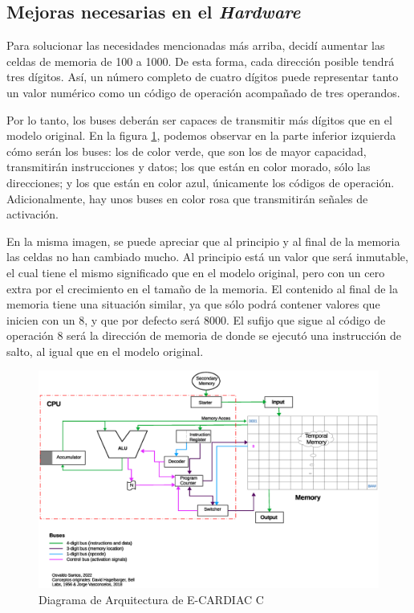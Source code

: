 \documentclass[letterpaper,12pt,oneside]{book}
\begin{document}
		\subsection{Mejoras necesarias en el \textit{Hardware}}
		
		Para solucionar las necesidades mencionadas más arriba, decidí aumentar las celdas de memoria de 100 a 1000. De esta forma, cada dirección posible tendrá
		tres dígitos. Así, un número completo de cuatro dígitos puede representar tanto un valor numérico como un código de operación acompañado de tres operandos.
  
        Por lo tanto, los buses deberán ser capaces de transmitir más dígitos que en el modelo original. En la figura \ref{fig:diagarquiConc}, 
		podemos observar
		en la parte inferior izquierda cómo serán los buses: los de color verde, que son los de mayor capacidad, transmitirán instrucciones y datos; los
		que están en color morado, sólo las direcciones; y los que están en color azul, únicamente los códigos de operación. Adicionalmente, hay unos buses
		en color rosa que transmitirán señales de activación.
  
        En la misma imagen, se puede apreciar que al principio y al final de la memoria las celdas no han cambiado
		mucho. Al principio está un valor que será inmutable, el cual tiene el mismo significado que en el modelo original, pero con un cero extra por el crecimiento
		en el tamaño de la memoria. El contenido al final de la memoria tiene una situación similar, ya que sólo podrá contener valores que inicien con un $8$, y
		que por defecto será $8000$. El sufijo que sigue al código de operación $8$ será la dirección de memoria de donde se ejecutó una instrucción de 
		salto, al igual que en el modelo original.
				
		\begin{figure}[h]		
			\centering
			\includegraphics[scale=0.5]{media/CARDIACC/Arquitectura_diagrama_concurrente.eps}
			\caption{Diagrama de Arquitectura de E-CARDIAC C}
			\label{fig:diagarquiConc}
		\end{figure}
		
\end{document}
